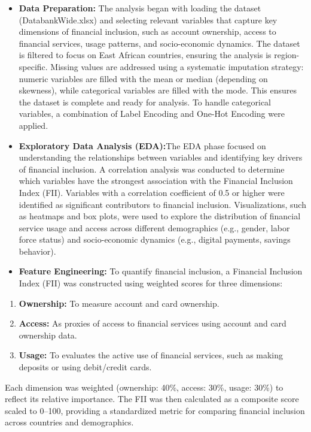 \documentclass[preprint, 3p,
authoryear]{elsarticle} %
\providecommand{\tightlist}{%
  \setlength{\itemsep}{0pt}\setlength{\parskip}{0pt}}
\begin{document}
\begin{itemize}
\item
  \textbf{Data Preparation:} The analysis began with loading the dataset
  (DatabankWide.xlsx) and selecting relevant variables that capture key
  dimensions of financial inclusion, such as account ownership, access
  to financial services, usage patterns, and socio-economic dynamics.
  The dataset is filtered to focus on East African countries, ensuring
  the analysis is region-specific. Missing values are addressed using a
  systematic imputation strategy: numeric variables are filled with the
  mean or median (depending on skewness), while categorical variables
  are filled with the mode. This ensures the dataset is complete and
  ready for analysis. To handle categorical variables, a combination of
  Label Encoding and One-Hot Encoding were applied.
\item
  \textbf{Exploratory Data Analysis (EDA):}The EDA phase focused on
  understanding the relationships between variables and identifying key
  drivers of financial inclusion. A correlation analysis was conducted
  to determine which variables have the strongest association with the
  Financial Inclusion Index (FII). Variables with a correlation
  coefficient of 0.5 or higher were identified as significant
  contributors to financial inclusion. Visualizations, such as heatmaps
  and box plots, were used to explore the distribution of financial
  service usage and access across different demographics (e.g., gender,
  labor force status) and socio-economic dynamics (e.g., digital
  payments, savings behavior).
\item
  \textbf{Feature Engineering:} To quantify financial inclusion, a
  Financial Inclusion Index (FII) was constructed using weighted scores
  for three dimensions:
\end{itemize}

\begin{enumerate}
\def\labelenumi{\roman{enumi}.}
\tightlist
\item
  \textbf{Ownership:} To measure account and card ownership.
\item
  \textbf{Access:} As proxies of access to financial services using
  account and card ownership data.
\item
  \textbf{Usage:} To evaluates the active use of financial services,
  such as making deposits or using debit/credit cards.
\end{enumerate}

Each dimension was weighted (ownership: 40\%, access: 30\%, usage: 30\%)
to reflect its relative importance. The FII was then calculated as a
composite score scaled to 0--100, providing a standardized metric for
comparing financial inclusion across countries and demographics.
\end{document}
